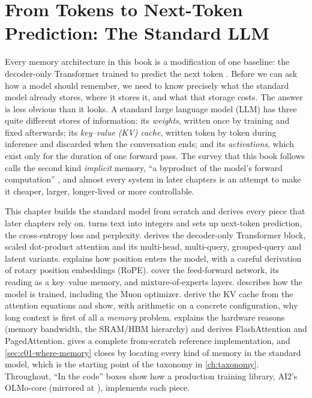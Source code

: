 \chapter{From Tokens to Next-Token Prediction: The Standard LLM}\label{ch:foundations}

Every memory architecture in this book is a modification of one baseline: the decoder-only
Transformer trained to predict the next token \citep{vaswani2017attention}. Before we can
ask how a model should remember, we need to know precisely what the standard model already
stores, where it stores it, and what that storage costs. The answer is less obvious than it
looks. A standard large language model (LLM) has three quite different stores of
information: its \emph{weights}, written once by training and fixed afterwards; its
\emph{key--value (KV) cache}, written token by token during inference and discarded when
the conversation ends; and its \emph{activations}, which exist only for the duration of one
forward pass. The survey that this book follows calls the second kind \emph{implicit}
memory, ``a byproduct of the model's forward computation'' \citep{zhoubian2026memory}, and
almost every system in later chapters is an attempt to make it cheaper, larger, longer-lived
or more controllable.

This chapter builds the standard model from scratch and derives every piece that later
chapters rely on.  turns text into integers and sets up next-token
prediction, the cross-entropy loss and perplexity.  derives the
decoder-only Transformer block, scaled dot-product attention and its multi-head, multi-query,
grouped-query and latent variants.  explains how position enters the
model, with a careful derivation of rotary position embeddings (RoPE).
 cover the feed-forward network, its reading as a key--value
memory, and mixture-of-experts layers.  describes how the model is
trained, including the Muon optimizer.  derive
the KV cache from the attention equations and show, with arithmetic on a concrete
configuration, why long context is first of all a \emph{memory} problem.
 explains the hardware reasons (memory bandwidth, the SRAM/HBM
hierarchy) and derives FlashAttention and PagedAttention.  gives a
complete from-scratch reference implementation, and \cref{sec:c01-where-memory} closes by
locating every kind of memory in the standard model, which is the starting point of the
taxonomy in \cref{ch:taxonomy}. Throughout, ``In the code'' boxes show how a production
training library, AI2's OLMo-core (mirrored at ), implements each
piece.

